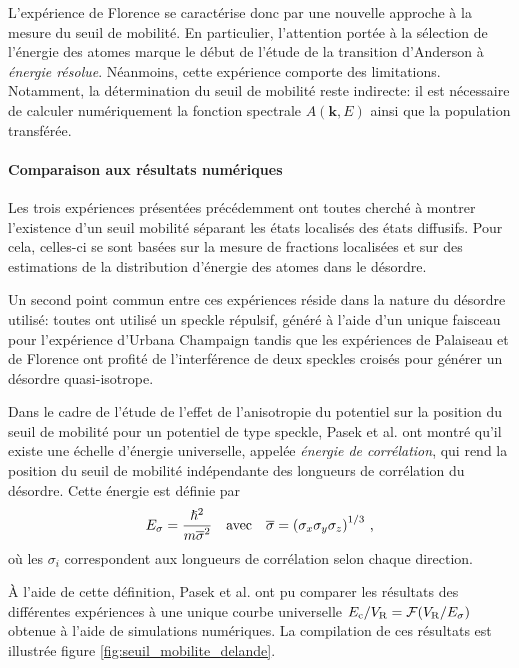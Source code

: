 L'expérience de Florence se caractérise donc par une nouvelle approche à la mesure du seuil de mobilité. En particulier, l'attention portée à la sélection de l'énergie des atomes marque le début de l'étude de la transition d'Anderson à \emph{énergie résolue}. Néanmoins, cette expérience comporte des limitations. Notamment, la détermination du seuil de mobilité reste indirecte: il est nécessaire de calculer numériquement la fonction spectrale $A(\mathbf{k},E)$ ainsi que la population transférée. 



\paragraph*{Comparaison aux résultats numériques}
Les trois expériences présentées précédemment \citep{kondov2011three}\citep{jendrzejewski2012three}\citep{semeghini2015measurement} ont toutes cherché à montrer l'existence d'un seuil mobilité séparant les états localisés des états diffusifs. Pour cela, celles-ci se sont basées sur la mesure de fractions localisées et sur des estimations de la distribution d'énergie des atomes dans le désordre.

Un second point commun entre ces expériences réside dans la nature du désordre utilisé: toutes ont utilisé un speckle répulsif, généré à l'aide d'un unique faisceau pour l'expérience d'Urbana Champaign tandis que les expériences de Palaiseau et de Florence ont profité de l'interférence de deux speckles croisés pour générer un désordre quasi-isotrope. 

Dans le cadre de l'étude de l'effet de l'anisotropie du potentiel sur la position du seuil de mobilité pour un potentiel de type speckle, Pasek et al. \citep{pasek2017anderson} ont montré qu'il existe une échelle d'énergie universelle, appelée \emph{énergie de corrélation}, qui rend la position du seuil de mobilité indépendante des longueurs de corrélation du désordre. Cette énergie est définie par
\begin{equation}
E_{\sigma}=\frac{\hslash^2}{m\overline{\sigma}^2} \quad \text{avec} \quad \overline{\sigma}={(\sigma_x \sigma_y \sigma_z)}^{1/3} \text{ ,}
\end{equation}
où les $\sigma_i$ correspondent aux longueurs de corrélation selon chaque direction.

À l'aide de cette définition, Pasek et al. ont pu comparer les résultats des différentes expériences à une unique courbe universelle $E_{\mathrm{c}}/V_{\mathrm{R}}=\mathcal{F}(V_{\mathrm{R}}/E_{\sigma})$ obtenue à l'aide de simulations numériques. La compilation de ces résultats est illustrée figure \ref{fig:seuil_mobilite_delande}.


